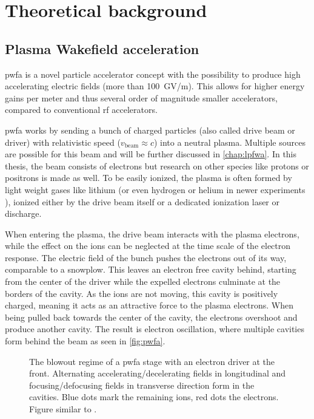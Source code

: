 \documentclass[bachelor_thesis]{subfiles}
\begin{document}
\chapter{Theoretical background} \label{chap:theory}
\section{Plasma Wakefield acceleration}
\Gls{pwfa} is a novel particle accelerator concept \cite{Chen1985} with the possibility to produce high accelerating electric fields (more than \qty{100}{\giga\volt/\m}). This allows for higher energy gains per meter
and thus several order of magnitude smaller accelerators, compared to conventional \gls{rf} accelerators.

\Gls{pwfa} works by sending a bunch of charged particles (also called drive beam or driver) with relativistic speed ($v_{\mathrm{beam}}\approx c$) into a neutral plasma. Multiple sources are possible for this beam and will be further discussed in \autoref{chap:lpfwa}.
In this thesis, the beam consists of electrons but research on other species like protons or positrons \cite{Gessner2016} is made as well. To be easily ionized, the plasma is often formed by light weight gases like lithium (or even hydrogen or helium in newer experiments \cite{Schoebel2022}), 
ionized either by the drive beam itself or a dedicated ionization laser or discharge.

When entering the plasma, the drive beam interacts with the plasma electrons, while the effect on the ions can be neglected at the time scale of the electron response. The electric field of the bunch pushes the electrons out of its way, comparable to a snowplow. 
This leaves an electron free cavity behind, starting from the center of the driver while the expelled electrons culminate at the borders of the cavity. As the ions are not moving, this cavity is positively charged, meaning it acts as an attractive force to the plasma electrons.
When being pulled back towards the center of the cavity, the electrons overshoot and produce another cavity. The result is electron oscillation, where multiple cavities form behind the beam as seen in \autoref{fig:pwfa}.

\begin{figure}
	\centering
	
	\caption{The blowout regime of a \gls{pwfa} stage with an electron driver at the front. Alternating accelerating/decelerating fields in longitudinal and focusing/defocusing fields in transverse direction form in the cavities. 
	Blue dots mark the remaining ions, red dots the electrons. Figure similar to \cite{Kurz2020}.}
	\label{fig:pwfa}
\end{figure}
\end{document}
